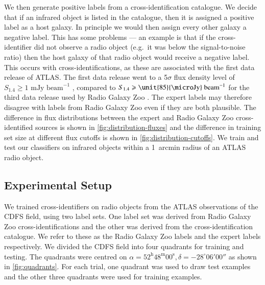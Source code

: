 \documentclass[fleqn,usenatbib,usedcolumn]{mnras}
\newcommand{\jansky}{\text{Jy}}
\begin{document}
    We then generate positive labels from a cross-identification catalogue.
    We decide that if an infrared object is listed in the catalogue, then it
    is assigned a positive label as a host galaxy. In principle we would
    then assign every other galaxy a negative label. This has some problems
    --- an example is that if the cross-identifier did not observe a radio
    object (e.g.~it was below the signal-to-noise ratio) then the host galaxy
    of that radio object would receive a negative label. This occurs with
    \citet{norris06} cross-identifications, as these are associated with the
    first data release of ATLAS. The first data release went to a 5$\sigma$
    flux density level of $S_{1.4} \geq 1 \text{ mJy beam}^{-1}$
    \citep{norris06}, compared to $S_{1.4} \geq \unit{85}{\micro\jansky}\text{
    beam}^{-1}$ for the third data release used by Radio Galaxy Zoo
    \citep{franzen15}. The expert labels may therefore disagree with labels
    from Radio Galaxy Zoo even if they are both plausible. The difference in
    flux distributions between the expert and Radio Galaxy Zoo
    cross-identified sources is shown in \autoref{fig:distribution-fluxes} and
    the difference in training set size at different flux cutoffs is shown in
    \autoref{fig:distribution-cutoffs}. We train and test our classifiers on
    infrared objects within a 1~arcmin radius of an ATLAS radio object.

  \subsection{Experimental Setup}
  \label{sec:experimental-setup}

    We trained cross-identifiers on radio objects from the ATLAS observations of
    the CDFS field, using two label sets. One label set was derived from Radio
    Galaxy Zoo cross-identifications and the other was derived from the
    \citet{norris06} cross-identification catalogue. We refer to these as the
    Radio Galaxy Zoo labels and the expert labels respectively. We divided the
    CDFS field into four quadrants for training and testing. The quadrants were
    centred on $\alpha = 52^\text{h}48^\text{m}00^\text{s},
    \delta = -28^\circ{}06'00''$ as shown in \autoref{fig:quadrants}. For
    each trial, one quadrant was used to draw test examples and the other three
    quadrants were used for training examples.
\end{document}
